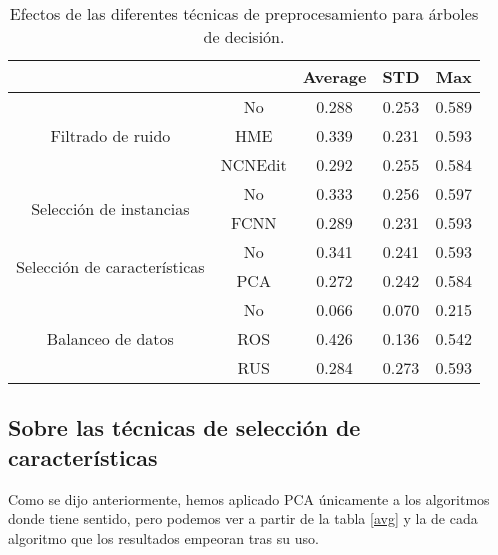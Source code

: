 \begin{table}
    \centering
    \begin{tabular}{cc|c|c|c|}
    \cline{3-5}
    \multicolumn{1}{l}{\textbf{}} & \textbf{} & \multicolumn{1}{c|}{\textbf{Average}} & \multicolumn{1}{c|}{\textbf{STD}} & \textbf{Max} \\ \hline
    \multicolumn{1}{|c|}{\multirow{3}{*}{Filtrado de ruido}}       & No        & 0.288 & 0.253
    & 0.589    \\ \cline{2-5} 
    \multicolumn{1}{|c|}{}  & HME       & 0.339 &  0.231
    & 0.593        \\ \cline{2-5} 
    \multicolumn{1}{|c|}{}  & NCNEdit   & 0.292 &  0.255
    & 0.584        \\ \hline
    \multicolumn{1}{|c|}{\multirow{2}{*}{Selección de instancias}} & No        & 0.333  & 0.256
    & 0.597        \\ \cline{2-5} 
    \multicolumn{1}{|c|}{}  & FCNN      & 0.289 &  0.231
    & 0.593        \\ \hline
    \multicolumn{1}{|c|}{\multirow{2}{*}{Selección de características}} & No        & 0.341  &  0.241
    & 0.593        \\ \cline{2-5} 
    \multicolumn{1}{|c|}{}  & PCA      & 0.272  & 0.242
    & 0.584        \\ \hline
    \multicolumn{1}{|c|}{\multirow{3}{*}{Balanceo de datos}}       & No        & 0.066  &  0.070
    & 0.215        \\ \cline{2-5} 
    \multicolumn{1}{|c|}{}  & ROS       & 0.426 &  0.136
    & 0.542        \\ \cline{2-5} 
    \multicolumn{1}{|c|}{}  & RUS       & 0.284 &  0.273
    & 0.593        \\ \hline
    \end{tabular}
    \caption{Efectos de las diferentes técnicas de preprocesamiento para árboles de decisión.}
    \label{dt}
\end{table}

\subsection{Sobre las técnicas de selección de características}

Como se dijo anteriormente, hemos aplicado PCA únicamente a los algoritmos donde tiene sentido, pero podemos ver a partir de la tabla \ref{avg} y la de cada algoritmo que los resultados empeoran tras su uso.

\vspace{\baselineskip}


